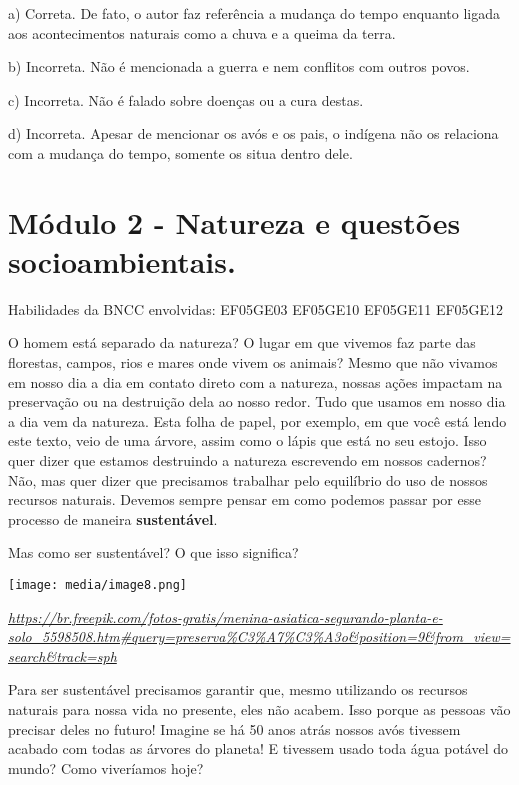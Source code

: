 a) Correta. De fato, o autor faz referência a mudança do tempo enquanto
ligada aos acontecimentos naturais como a chuva e a queima da terra.

b) Incorreta. Não é mencionada a guerra e nem conflitos com outros
povos.

c) Incorreta. Não é falado sobre doenças ou a cura destas.

d) Incorreta. Apesar de mencionar os avós e os pais, o indígena não os
relaciona com a mudança do tempo, somente os situa dentro dele.

\section{Módulo 2 - Natureza e questões
socioambientais.}\label{muxf3dulo-2---natureza-e-questuxf5es-socioambientais.}

Habilidades da BNCC envolvidas: EF05GE03 EF05GE10 EF05GE11 EF05GE12

O homem está separado da natureza? O lugar em que vivemos faz parte das
florestas, campos, rios e mares onde vivem os animais? Mesmo que não
vivamos em nosso dia a dia em contato direto com a natureza, nossas
ações impactam na preservação ou na destruição dela ao nosso redor. Tudo
que usamos em nosso dia a dia vem da natureza. Esta folha de papel, por
exemplo, em que você está lendo este texto, veio de uma árvore, assim
como o lápis que está no seu estojo. Isso quer dizer que estamos
destruindo a natureza escrevendo em nossos cadernos? Não, mas quer dizer
que precisamos trabalhar pelo equilíbrio do uso de nossos recursos
naturais. Devemos sempre pensar em como podemos passar por esse processo
de maneira \textbf{sustentável}.

Mas como ser sustentável? O que isso significa?

\texttt{[image: media/image8.png]}

\href{https://br.freepik.com/fotos-gratis/menina-asiatica-segurando-planta-e-solo_5598508.htm\#query=preserva\%C3\%A7\%C3\%A3o\&position=9\&from_view=search\&track=sph}{\emph{https://br.freepik.com/fotos-gratis/menina-asiatica-segurando-planta-e-solo\_5598508.htm\#query=preserva\%C3\%A7\%C3\%A3o\&position=9\&from\_view=search\&track=sph}}

Para ser sustentável precisamos garantir que, mesmo utilizando os
recursos naturais para nossa vida no presente, eles não acabem. Isso
porque as pessoas vão precisar deles no futuro! Imagine se há 50 anos
atrás nossos avós tivessem acabado com todas as árvores do planeta! E
tivessem usado toda água potável do mundo? Como viveríamos hoje?

